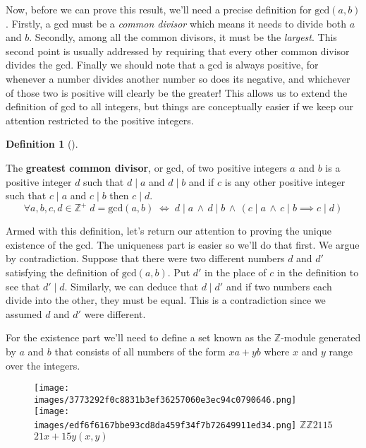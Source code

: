 \documentclass[10pt,]{book}
\newcommand{\terminology}[1]{\textbf{#1}}
\theoremstyle{plain}
\theoremstyle{definition}
\newtheorem{definition}[theorem]{Definition}
\theoremstyle{definition}
\numberwithin{equation}{section}
\newcommand{\divides}{\!\mid\!}
\renewcommand{\gcd}[2]{\mbox{gcd} (#1, #2)}
\newcommand{\Integers}{{\mathbb Z}}
\begin{document}
    Now, before we can prove this result, we'll need a precise definition
    for \(\gcd{a}{b}\). Firstly, a gcd must be a \emph{common divisor} which
    means it needs to divide both \(a\) and \(b\). Secondly, among all the common
    divisors, it must be the \emph{largest}. This second point is usually
    addressed
    by requiring that every other common divisor divides the gcd. Finally we
    should note that a gcd is always positive, for whenever a number divides
    another number so does its negative, and whichever of those two is positive
    will clearly be the greater! This allows us to extend the definition of
    gcd to all integers, but things are conceptually easier if we
    keep our attention restricted to the positive integers.
\begin{definition}[{}]\label{definition-8}

        The \terminology{greatest common divisor}, or gcd, of two positive
        integers \(a\) and \(b\)
        is a positive integer \(d\) such that \(d \divides a\) and \(d \divides b\) and if \(c\) is any
        other positive integer such that \(c \divides a\) and \(c \divides b\) then \(c \divides d\).
        \begin{equation*}
          \forall a,b,c,d \in \Integers^+ \; d=\gcd{a}{b} \; \iff \;
          d \divides a \, \land \, d \divides b \, \land \, (c \divides a \, \land \, c \divides b  \implies c \divides d)
        \end{equation*}
\end{definition}
\par

    Armed with this definition, let's return our attention to proving the
    unique existence of the gcd. The uniqueness part is easier so we'll
    do that first. We argue by contradiction. Suppose that there were
    two different numbers \(d\) and \(d'\) satisfying the definition of \(\gcd{a}{b}\).
    Put \(d'\) in the place of \(c\) in the definition to see that \(d' \divides d\).
    Similarly, we can deduce that \(d \divides d'\) and if two numbers each divide
    into the other, they must be equal. This is a contradiction since we
    assumed \(d\) and \(d'\) were different.
\par

    For the existence part we'll need to define a set \textemdash{} known as the
    \(\Integers\)-module generated by \(a\) and \(b\) \textemdash{} that consists of all
    numbers of the form \(xa+yb\) where \(x\) and \(y\) range over the integers.
\leavevmode%
\begin{figure}
\centering
\texttt{[image: images/3773292f0c8831b3ef36257060e3ec94c0790646.png]}
\texttt{[image: images/edf6f6167bbe93cd8da459f34f7b72649911ed34.png]}
\(\Integers\)\(\Integers\)\(21\)\(15\)\(21x+15y\)\((x,y)\)\end{figure}
\par
\end{document}

